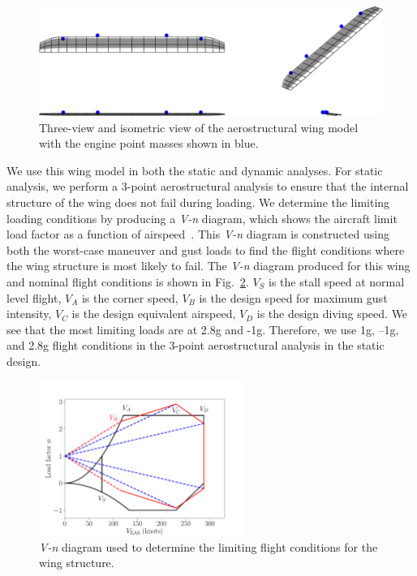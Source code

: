\begin{figure}[h]
\begin{center}
 \includegraphics[width=1.0\textwidth]{../Images/aerostruct_wing}
 \caption{Three-view and isometric view of the aerostructural wing model with the engine point masses shown in blue.}
 \label{f:OAS_wing}
\end{center}
\end{figure}

We use this wing model in both the static and dynamic analyses.
For static analysis, we perform a 3-point aerostructural analysis to ensure that the internal structure of the wing does not fail during loading.
We determine the limiting loading conditions by producing a \textit{V-n} diagram, which shows the aircraft limit load factor as a function of airspeed~\cite{Raymer2012}.
This \textit{V-n} diagram is constructed using both the worst-case maneuver and gust loads to find the flight conditions where the wing structure is most likely to fail.
The \textit{V-n} diagram produced for this wing and nominal flight conditions is shown in Fig.~\ref{f:v_n_diagram}.
$V_S$ is the stall speed at normal level flight, $V_A$ is the corner speed, $V_B$ is the design speed for maximum gust intensity, $V_C$ is the design equivalent airspeed, $V_D$ is the design diving speed.
We see that the most limiting loads are at 2.8g and -1g.
Therefore, we use 1g, --1g, and 2.8g flight conditions in the 3-point aerostructural analysis in the static design.

\begin{figure}
\begin{center}
 \includegraphics[width=0.6\textwidth]{../Images/v_n_diagram}
 \caption{\textit{V-n} diagram used to determine the limiting flight conditions for the wing structure.}
 \label{f:v_n_diagram}
\end{center}
\end{figure}

